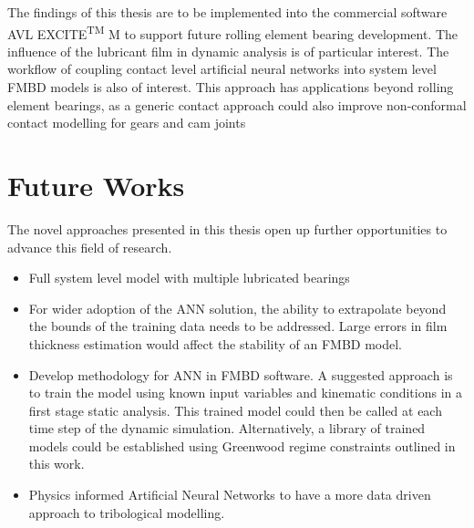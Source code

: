 The findings of this thesis are to be implemented into the commercial software AVL EXCITE\textsuperscript{TM} M to support future rolling element bearing development. The influence of the lubricant film in dynamic analysis is of particular interest. The workflow of coupling contact level artificial neural networks into system level FMBD models is also of interest. This approach has applications beyond rolling element bearings, as a generic contact approach could also improve non-conformal contact modelling for gears and cam joints

\section{Future Works}

The novel approaches presented in this thesis open up further opportunities to advance this field of research.

\begin{itemize}
	\item Full system level model with multiple lubricated bearings
	\item For wider adoption of the ANN solution, the ability to extrapolate beyond the bounds of the training data needs to be addressed. Large errors in film thickness estimation would affect the stability of an FMBD model.
	\item Develop methodology for ANN in FMBD software. A suggested approach is to train the model using known input variables and kinematic conditions in a first stage static analysis. This trained model could then be called at each time step of the dynamic simulation. Alternatively, a library of trained models could be established using Greenwood regime constraints outlined in this work.
	\item Physics informed Artificial Neural Networks to have a more data driven approach to tribological modelling.
\end{itemize}